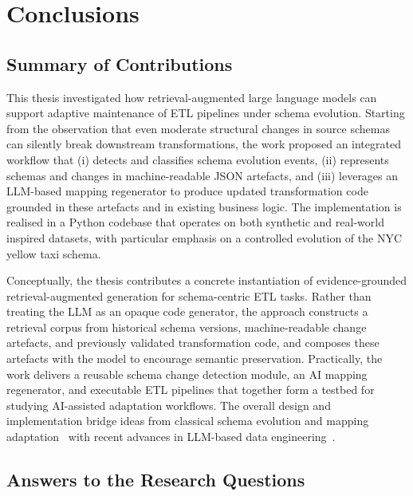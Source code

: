 \section{Conclusions}
\label{sec:conclusions}

\subsection{Summary of Contributions}

This thesis investigated how retrieval-augmented large language models can support adaptive maintenance of ETL pipelines under schema evolution. Starting from the observation that even moderate structural changes in source schemas can silently break downstream transformations, the work proposed an integrated workflow that (i) detects and classifies schema evolution events, (ii) represents schemas and changes in machine-readable JSON artefacts, and (iii) leverages an LLM-based mapping regenerator to produce updated transformation code grounded in these artefacts and in existing business logic. The implementation is realised in a Python codebase that operates on both synthetic and real-world inspired datasets, with particular emphasis on a controlled evolution of the NYC yellow taxi schema.

Conceptually, the thesis contributes a concrete instantiation of evidence-grounded retrieval-augmented generation for schema-centric ETL tasks. Rather than treating the LLM as an opaque code generator, the approach constructs a retrieval corpus from historical schema versions, machine-readable change artefacts, and previously validated transformation code, and composes these artefacts with the model to encourage semantic preservation. Practically, the work delivers a reusable schema change detection module, an AI mapping regenerator, and executable ETL pipelines that together form a testbed for studying AI-assisted adaptation workflows. The overall design and implementation bridge ideas from classical schema evolution and mapping adaptation~\cite{velegrakis2003mapping,yu2005semantic,rahm2001survey} with recent advances in LLM-based data engineering~\cite{chen2021evaluating,lewis2020retrieval,narayan2022foundation,buss2025towards}.

\subsection{Answers to the Research Questions}


